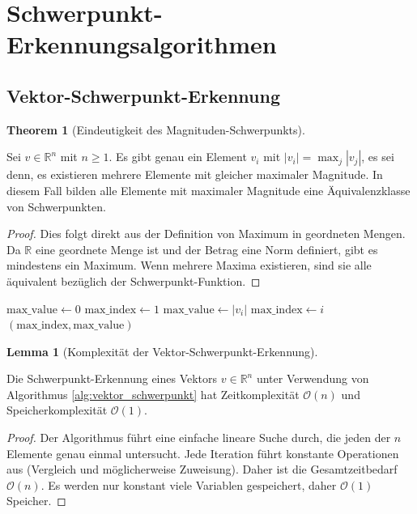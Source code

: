 \documentclass[a4paper,12pt]{article}
\theoremstyle{definition}
\newtheorem{lemma}{Lemma}
\newtheorem{theorem}{Theorem}
\begin{document}
\section{Schwerpunkt-Erkennungsalgorithmen}

\subsection{Vektor-Schwerpunkt-Erkennung}

\begin{theorem}[Eindeutigkeit des Magnituden-Schwerpunkts]
\label{thm:eindeutig_magnituden}

Sei $v \in \mathbb{R}^n$ mit $n \geq 1$. Es gibt genau ein Element $v_i$ mit $|v_i| = \max_j |v_j|$, es sei denn, es existieren mehrere Elemente mit gleicher maximaler Magnitude. In diesem Fall bilden alle Elemente mit maximaler Magnitude eine Äquivalenzklasse von Schwerpunkten.

\begin{proof}
Dies folgt direkt aus der Definition von Maximum in geordneten Mengen. Da $\mathbb{R}$ eine geordnete Menge ist und der Betrag eine Norm definiert, gibt es mindestens ein Maximum. Wenn mehrere Maxima existieren, sind sie alle äquivalent bezüglich der Schwerpunkt-Funktion.
\end{proof}
\end{theorem}

\begin{algorithm}[h]
\caption{Vektor-Schwerpunkt-Erkennung}
\label{alg:vektor_schwerpunkt}
\begin{algorithmic}[1]
	\State $\text{max\_value} \leftarrow 0$
	\State $\text{max\_index} \leftarrow 1$
			\State $\text{max\_value} \leftarrow |v_i|$
			\State $\text{max\_index} \leftarrow i$
		\EndIf
	\EndFor
	\State \Return $(\text{max\_index}, \text{max\_value})$
\EndProcedure
\end{algorithmic}
\end{algorithm}

\begin{lemma}[Komplexität der Vektor-Schwerpunkt-Erkennung]
\label{lem:komplexitaet_vektor}

Die Schwerpunkt-Erkennung eines Vektors $v \in \mathbb{R}^n$ unter Verwendung von Algorithmus \ref{alg:vektor_schwerpunkt} hat Zeitkomplexität $\mathcal{O}(n)$ und Speicherkomplexität $\mathcal{O}(1)$.

\begin{proof}
Der Algorithmus führt eine einfache lineare Suche durch, die jeden der $n$ Elemente genau einmal untersucht. Jede Iteration führt konstante Operationen aus (Vergleich und möglicherweise Zuweisung). Daher ist die Gesamtzeitbedarf $\mathcal{O}(n)$. Es werden nur konstant viele Variablen gespeichert, daher $\mathcal{O}(1)$ Speicher.
\end{proof}
\end{lemma}
\end{document}
